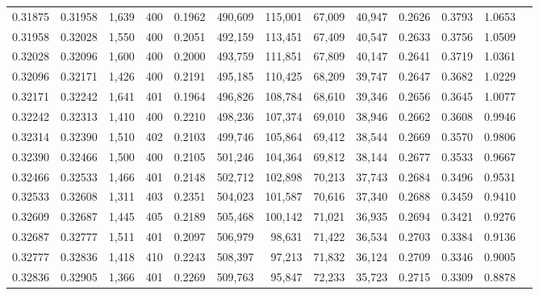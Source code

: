 \begin{tabular}{rrrrrrrrrrrrr}
0.31875 & 0.31958 &  1,639 & 400 &                                     0.1962 & 490,609 & 115,001 &  67,009 &  40,947 & 0.2626 & 0.3793 & 1.0653 \\
0.31958 & 0.32028 &  1,550 & 400 &                                     0.2051 & 492,159 & 113,451 &  67,409 &  40,547 & 0.2633 & 0.3756 & 1.0509 \\
0.32028 & 0.32096 &  1,600 & 400 &                                     0.2000 & 493,759 & 111,851 &  67,809 &  40,147 & 0.2641 & 0.3719 & 1.0361 \\
0.32096 & 0.32171 &  1,426 & 400 &                                     0.2191 & 495,185 & 110,425 &  68,209 &  39,747 & 0.2647 & 0.3682 & 1.0229 \\
0.32171 & 0.32242 &  1,641 & 401 &                                     0.1964 & 496,826 & 108,784 &  68,610 &  39,346 & 0.2656 & 0.3645 & 1.0077 \\
0.32242 & 0.32313 &  1,410 & 400 &                                     0.2210 & 498,236 & 107,374 &  69,010 &  38,946 & 0.2662 & 0.3608 & 0.9946 \\
0.32314 & 0.32390 &  1,510 & 402 &                                     0.2103 & 499,746 & 105,864 &  69,412 &  38,544 & 0.2669 & 0.3570 & 0.9806 \\
0.32390 & 0.32466 &  1,500 & 400 &                                     0.2105 & 501,246 & 104,364 &  69,812 &  38,144 & 0.2677 & 0.3533 & 0.9667 \\
0.32466 & 0.32533 &  1,466 & 401 &                                     0.2148 & 502,712 & 102,898 &  70,213 &  37,743 & 0.2684 & 0.3496 & 0.9531 \\
0.32533 & 0.32608 &  1,311 & 403 &                                     0.2351 & 504,023 & 101,587 &  70,616 &  37,340 & 0.2688 & 0.3459 & 0.9410 \\
0.32609 & 0.32687 &  1,445 & 405 &                                     0.2189 & 505,468 & 100,142 &  71,021 &  36,935 & 0.2694 & 0.3421 & 0.9276 \\
0.32687 & 0.32777 &  1,511 & 401 &                                     0.2097 & 506,979 &  98,631 &  71,422 &  36,534 & 0.2703 & 0.3384 & 0.9136 \\
0.32777 & 0.32836 &  1,418 & 410 &                                     0.2243 & 508,397 &  97,213 &  71,832 &  36,124 & 0.2709 & 0.3346 & 0.9005 \\
0.32836 & 0.32905 &  1,366 & 401 &                                     0.2269 & 509,763 &  95,847 &  72,233 &  35,723 & 0.2715 & 0.3309 & 0.8878 \\

\end{tabular}
